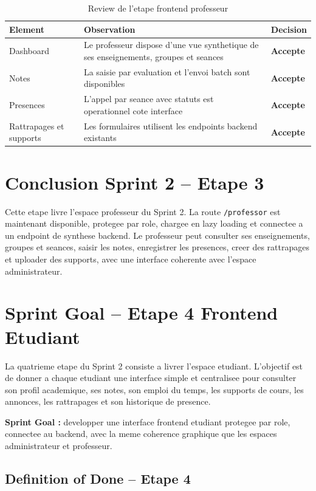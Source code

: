 \documentclass[12pt,a4paper]{report}
\begin{document}
\begin{table}[H]
\centering
\caption{Review de l'etape frontend professeur}
\begin{tabular}{|p{5cm}|p{5cm}|p{3cm}|}
\hline
\textbf{Element} & \textbf{Observation} & \textbf{Decision} \\
\hline
Dashboard & Le professeur dispose d'une vue synthetique de ses enseignements, groupes et seances & \textbf{Accepte} \\
\hline
Notes & La saisie par evaluation et l'envoi batch sont disponibles & \textbf{Accepte} \\
\hline
Presences & L'appel par seance avec statuts est operationnel cote interface & \textbf{Accepte} \\
\hline
Rattrapages et supports & Les formulaires utilisent les endpoints backend existants & \textbf{Accepte} \\
\hline
\end{tabular}
\end{table}

\section{Conclusion Sprint 2 -- Etape 3}

Cette etape livre l'espace professeur du Sprint 2. La route \texttt{/professor} est maintenant disponible, protegee par role, chargee en lazy loading et connectee a un endpoint de synthese backend. Le professeur peut consulter ses enseignements, groupes et seances, saisir les notes, enregistrer les presences, creer des rattrapages et uploader des supports, avec une interface coherente avec l'espace administrateur.

\section{Sprint Goal -- Etape 4 Frontend Etudiant}

La quatrieme etape du Sprint 2 consiste a livrer l'espace etudiant. L'objectif est de donner a chaque etudiant une interface simple et centralisee pour consulter son profil academique, ses notes, son emploi du temps, les supports de cours, les annonces, les rattrapages et son historique de presence.

\textbf{Sprint Goal :} developper une interface frontend etudiant protegee par role, connectee au backend, avec la meme coherence graphique que les espaces administrateur et professeur.

\subsection{Definition of Done -- Etape 4}
\end{document}
